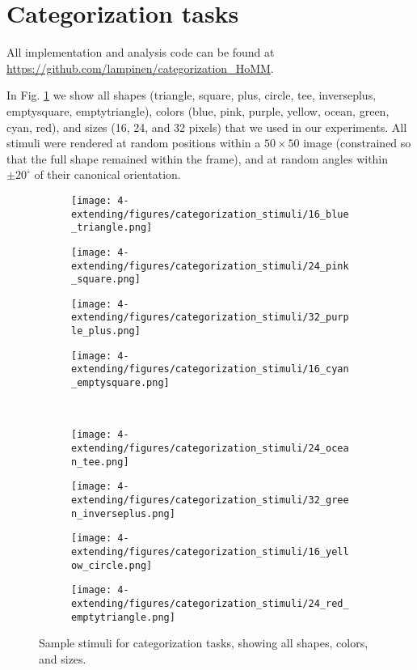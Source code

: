 \section{Categorization tasks} \label{app:extending_categorization_methods}
All implementation and analysis code can be found at \url{https://github.com/lampinen/categorization_HoMM}.\par
In Fig. \ref{fig:app_extending_cat_stims} we show all shapes (triangle, square, plus, circle, tee, inverseplus, emptysquare, emptytriangle), colors (blue, pink, purple, yellow, ocean, green, cyan, red), and sizes (16, 24, and 32 pixels) that we used in our experiments. All stimuli were rendered at random positions within a \(50 \times 50\) image (constrained so that the full shape remained within the frame), and at random angles within \(\pm20^{\circ}\) of their canonical orientation.\par

\begin{figure}[!htb]
\centering
\begin{subfigure}{0.24\textwidth}
\texttt{[image: 4-extending/figures/categorization\_stimuli/16\_blue\_triangle.png]}
\end{subfigure}%
\begin{subfigure}{0.24\textwidth}
\texttt{[image: 4-extending/figures/categorization\_stimuli/24\_pink\_square.png]}
\end{subfigure}%
\begin{subfigure}{0.24\textwidth}
\texttt{[image: 4-extending/figures/categorization\_stimuli/32\_purple\_plus.png]}
\end{subfigure}%
\begin{subfigure}{0.24\textwidth}
\texttt{[image: 4-extending/figures/categorization\_stimuli/16\_cyan\_emptysquare.png]}
\end{subfigure}\\
\begin{subfigure}{0.24\textwidth}
\texttt{[image: 4-extending/figures/categorization\_stimuli/24\_ocean\_tee.png]}
\end{subfigure}%
\begin{subfigure}{0.24\textwidth}
\texttt{[image: 4-extending/figures/categorization\_stimuli/32\_green\_inverseplus.png]}
\end{subfigure}%
\begin{subfigure}{0.24\textwidth}
\texttt{[image: 4-extending/figures/categorization\_stimuli/16\_yellow\_circle.png]}
\end{subfigure}%
\begin{subfigure}{0.24\textwidth}
\texttt{[image: 4-extending/figures/categorization\_stimuli/24\_red\_emptytriangle.png]}
\end{subfigure}%
\caption{Sample stimuli for categorization tasks, showing all shapes, colors, and sizes.} \label{fig:app_extending_cat_stims}
\end{figure}

